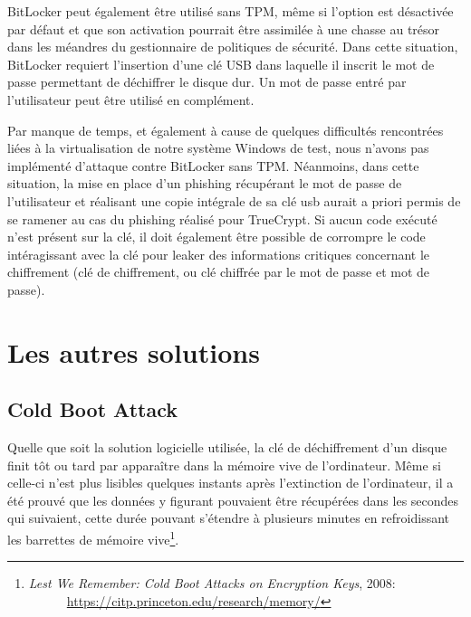 \documentclass[12pt,a4paper]{article}
\begin{document}
BitLocker peut également être utilisé sans TPM, même si l'option est désactivée
par défaut et que son activation pourrait être assimilée à une chasse au trésor
dans les méandres du gestionnaire de politiques de sécurité. Dans cette
situation, BitLocker requiert l'insertion d'une clé USB dans laquelle il
inscrit le mot de passe permettant de déchiffrer le disque dur. Un mot de passe
entré par l'utilisateur peut être utilisé en complément.

Par manque de temps, et également à cause de quelques difficultés rencontrées
liées à la virtualisation de notre système Windows de test, nous n'avons pas
implémenté d'attaque contre BitLocker sans TPM. Néanmoins, dans cette
situation, la mise en place d'un phishing récupérant le mot de passe de
l'utilisateur et réalisant une copie intégrale de sa clé usb aurait a priori
permis de se ramener au cas du phishing réalisé pour TrueCrypt. Si aucun code
exécuté n'est présent sur la clé, il doit également être possible de corrompre
le code intéragissant avec la clé pour leaker des informations critiques
concernant le chiffrement (clé de chiffrement, ou clé chiffrée par le mot de
passe et mot de passe).


\section{Les autres solutions}

\subsection{Cold Boot Attack}

Quelle que soit la solution logicielle utilisée, la clé de déchiffrement d'un
disque finit tôt ou tard par apparaître dans la mémoire vive de l'ordinateur.
Même si celle-ci n'est plus lisibles quelques instants après l'extinction de
l'ordinateur, il a été prouvé que les données y figurant pouvaient être
récupérées dans les secondes qui suivaient, cette durée pouvant s'étendre à
plusieurs minutes en refroidissant les barrettes de mémoire
vive\footnote{\textit{Lest We Remember: Cold Boot Attacks on Encryption Keys},
2008:\\ ~~~~~~\url{https://citp.princeton.edu/research/memory/}}.
\end{document}
